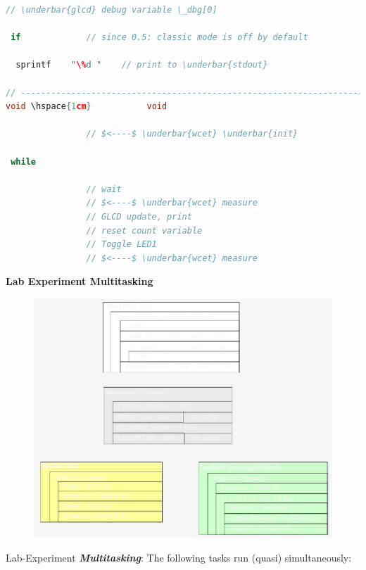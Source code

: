 \begin{lstlisting}[style=mystyle, language=c]
					// \underbar{glcd} debug variable \_dbg[0]

 if    			// since 0.5: classic mode is off by default

  sprintf    "\%d "    // print to \underbar{stdout}

// ----------------------------------------------------------------------------
void \hspace{1cm}           void 

				// $<----$ \underbar{wcet} \underbar{init}

 while 
 
				// wait
				// $<----$ \underbar{wcet} measure
				// GLCD update, print
				// reset count variable
				// Toggle LED1
				// $<----$ \underbar{wcet} measure
\end{lstlisting}

{\rot\bf Lab Experiment Multitasking}\\

 	\begin{figure}[h]
    \centering
    \includegraphics[width=13cm, height=9cm]{Images/image134.png}
    \label{fig:Fig }
    \end{figure}
    
Lab-Experiment \textbf{\textit{Multitasking}}: The following tasks run (quasi) simultaneously:

